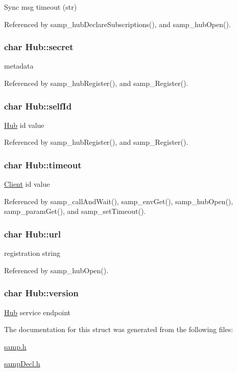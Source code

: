 Sync msg timeout (str) 

Referenced by samp\_\-hubDeclareSubscriptions(), and samp\_\-hubOpen().\hypertarget{structHub_52a6b65f54e98c4f3b7441808e30fa6c}{
\subsubsection[{secret}]{\setlength{\rightskip}{0pt plus 5cm}char {\bf Hub::secret}}}
\label{structHub_52a6b65f54e98c4f3b7441808e30fa6c}


metadata 

Referenced by samp\_\-hubRegister(), and samp\_\-Register().\hypertarget{structHub_ce254c7adba1a20deb1dff7e112dd2a8}{
\subsubsection[{selfId}]{\setlength{\rightskip}{0pt plus 5cm}char {\bf Hub::selfId}}}
\label{structHub_ce254c7adba1a20deb1dff7e112dd2a8}


\hyperlink{structHub}{Hub} id value 

Referenced by samp\_\-hubRegister(), and samp\_\-Register().\hypertarget{structHub_b69adb014b0cef61d6632e60fb2dff5b}{
\subsubsection[{timeout}]{\setlength{\rightskip}{0pt plus 5cm}char {\bf Hub::timeout}}}
\label{structHub_b69adb014b0cef61d6632e60fb2dff5b}


\hyperlink{structClient}{Client} id value 

Referenced by samp\_\-callAndWait(), samp\_\-envGet(), samp\_\-hubOpen(), samp\_\-paramGet(), and samp\_\-setTimeout().\hypertarget{structHub_81adb6d0cab27f61c0aaebbb7b7685e4}{
\subsubsection[{url}]{\setlength{\rightskip}{0pt plus 5cm}char {\bf Hub::url}}}
\label{structHub_81adb6d0cab27f61c0aaebbb7b7685e4}


registration string 

Referenced by samp\_\-hubOpen().\hypertarget{structHub_0e07ef26e39ed1282042364297591df5}{
\subsubsection[{version}]{\setlength{\rightskip}{0pt plus 5cm}char {\bf Hub::version}}}
\label{structHub_0e07ef26e39ed1282042364297591df5}


\hyperlink{structHub}{Hub} service endpoint 

The documentation for this struct was generated from the following files:\begin{CompactItemize}
\item 
\hyperlink{samp_8h}{samp.h}\item 
\hyperlink{sampDecl_8h}{sampDecl.h}\end{CompactItemize}
